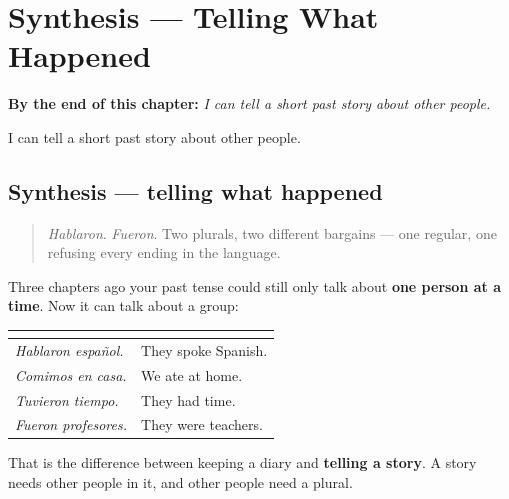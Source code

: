 
\chapter{Synthesis --- Telling What Happened}
\label{ch:sintesis-preterito-completo}

\begin{chapteropening}
\textbf{By the end of this chapter:} \emph{I can tell a short past story about other people.}

I can tell a short past story about other people.
\end{chapteropening}

\section[Practice]{Synthesis — telling what happened}

\label{lesson:ES-C55-sintesis-preterito-completo}



\begin{quote}
\emph{Hablaron}. \emph{Fueron}. Two plurals, two different bargains — one regular, one refusing every ending in the language.
\end{quote}

\begin{grammarlens}[title={What you've built}]
Three chapters ago your past tense could still only talk about \textbf{one person at a time}. Now it can talk about a group:

\noindent
\begin{tabularx}{\linewidth}{@{}>{\raggedright\arraybackslash}X>{\raggedright\arraybackslash}X@{}}
\toprule
\textbf{} & \textbf{} \\
\midrule
\emph{Hablaron español.} & They spoke Spanish. \\
\emph{Comimos en casa.} & We ate at home. \\
\emph{Tuvieron tiempo.} & They had time. \\
\emph{Fueron profesores.} & They were teachers. \\
\bottomrule
\end{tabularx}

That is the difference between keeping a diary and \textbf{telling a story}. A story needs other people in it, and other people need a plural.
\end{grammarlens}

